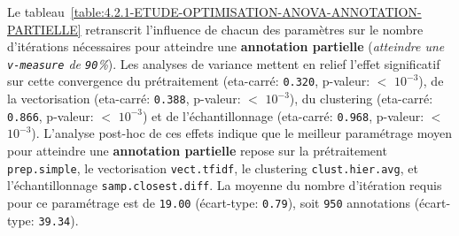 			Le tableau~\ref{table:4.2.1-ETUDE-OPTIMISATION-ANOVA-ANNOTATION-PARTIELLE} retranscrit l'influence de chacun des paramètres sur le nombre d'itérations nécessaires pour atteindre une \textbf{annotation partielle} (\textit{atteindre une \texttt{v-measure} de \texttt{90}\%}).
			Les analyses de variance mettent en relief l'effet significatif sur cette convergence du prétraitement (eta-carré: \texttt{0.320}, p-valeur: \(<\) \texttt{\(10^{-3}\)}), de la vectorisation (eta-carré: \texttt{0.388}, p-valeur: \(<\) \texttt{\(10^{-3}\)}), du clustering (eta-carré: \texttt{0.866}, p-valeur: \(<\) \texttt{\(10^{-3}\)}) et de l'échantillonnage (eta-carré: \texttt{0.968}, p-valeur: \(<\) \texttt{\(10^{-3}\)}).
			L'analyse post-hoc de ces effets indique que le meilleur paramétrage moyen pour atteindre une \textbf{annotation partielle} repose sur la prétraitement \texttt{prep.simple}, le vectorisation \texttt{vect.tfidf}, le clustering \texttt{clust.hier.avg}, et l'échantillonnage \texttt{samp.closest.diff}. La moyenne du nombre d'itération requis pour ce paramétrage est de \texttt{19.00} (écart-type: \texttt{0.79}), soit \texttt{950} annotations (écart-type: \texttt{39.34}).
